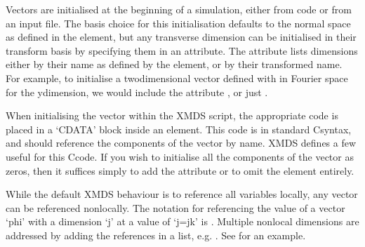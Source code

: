 \documentclass[letterpaper,10pt,english]{sphinxmanual}
\begin{document}
\ignorespaces 
\sphinxAtStartPar
Vectors are initialised at the beginning of a simulation, either from code or from an input file.  The basis choice for this initialisation defaults to the normal space as defined in the  element, but any transverse dimension can be initialised in their transform basis by specifying them in an  attribute.  The  attribute lists dimensions either by their name as defined by the  element, or by their transformed name.  For example, to initialise a two\sphinxhyphen{}dimensional vector defined with  in Fourier space for the y\sphinxhyphen{}dimension, we would include the attribute , or just .

\ignorespaces {}\label{\detokenize{reference_elements:initialisationelement}}
\sphinxAtStartPar
When initialising the vector within the XMDS script, the appropriate code is placed in a ‘CDATA’ block inside an  element.  This code is in standard C\sphinxhyphen{}syntax, and should reference the components of the vector by name.  XMDS defines a few useful {\hyperref[\detokenize{reference_elements:xmdscsyntax}]{}} for this C\sphinxhyphen{}code.  If you wish to initialise all the components of the vector as zeros, then it suffices simply to add the attribute  or to omit the  element entirely.

\ignorespaces {}\label{\detokenize{reference_elements:referencingnonlocal}}
\sphinxAtStartPar
While the default XMDS behaviour is to reference all variables locally, any vector can be referenced non\sphinxhyphen{}locally.  The notation for referencing the value of a vector ‘phi’ with a dimension ‘j’ at a value of ‘j=jk’ is .  Multiple non\sphinxhyphen{}local dimensions are addressed by adding the references in a list, e.g. .  See  for an example.
\end{document}
